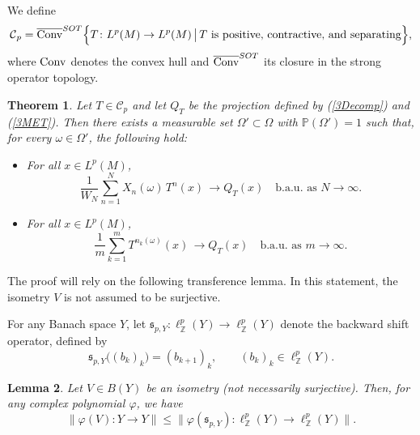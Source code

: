 \documentclass[12pt]{amsart}
\newcommand{\Pdb}{\mbox{$\mathbb{P}$}}
\newcommand{\C}{\mbox{${\mathcal C}$}}
\newtheorem{theorem}{Theorem}[section]
\newtheorem{lemma}[theorem]{Lemma}
\theoremstyle{remark}
\theoremstyle{definition}
\numberwithin{equation}{section}
\begin{document}
We define
$$
\C_p = \overline{\rm Conv}^{SOT} \Bigl\{ T \colon L^p(M) \to L^p(M) \,\big|\, 
T \text{ is positive, contractive, and separating} \Bigr\},
$$
where ${\rm Conv}$ denotes the convex hull and $\overline{\rm Conv}^{SOT}$ its closure in the strong operator topology.

\begin{theorem}\label{6SepMain}
Let $T\in\C_p$ and let $Q_T$ be the projection defined by (\ref{3Decomp}) and (\ref{3MET}). Then there exists a measurable set $\Omega'\subset \Omega$ with $\Pdb(\Omega')=1$ such that, for every $\omega\in\Omega'$, the following hold:

\begin{itemize}
\item[(1)] For all $x\in L^p(M)$,
$$
\frac{1}{W_N}\sum_{n=1}^N X_n(\omega)\, T^n(x)\,\longrightarrow Q_{T}(x) 
\quad\text{b.a.u. as } N\to\infty.
$$

\item[(2)] For all $x\in L^p(M)$,
$$
\frac{1}{m}\sum_{k=1}^m T^{n_k(\omega)}(x)\,\longrightarrow Q_{T}(x) 
\quad\text{b.a.u. as } m\to\infty.
$$
\end{itemize}
\end{theorem}
The proof will rely on the following transference lemma. 
In this statement, the isometry $V$ is not assumed to be surjective.

For any Banach space $Y$, let 
${\mathfrak s}_{p,Y}\colon \ell^p_{\mathbb Z}(Y) \to \ell^p_{\mathbb Z}(Y)$ 
denote the backward shift operator, defined by
$$
{\mathfrak s}_{p,Y}\bigl((b_k)_k\bigr) = (b_{k+1})_k, 
\qquad (b_k)_k \in \ell^p_{\mathbb Z}(Y).
$$


\begin{lemma}\label{6Transfer}
Let $V\in B(Y)$ be an isometry (not necessarily surjective). 
Then, for any complex polynomial $\varphi$, we have
$$
\|\varphi(V)\colon Y \longrightarrow Y\| 
\leq \|\varphi({\mathfrak s}_{p,Y})\colon 
\ell^p_{\mathbb Z}(Y) \longrightarrow \ell^p_{\mathbb Z}(Y)\|.
$$
\end{lemma}
\end{document}
